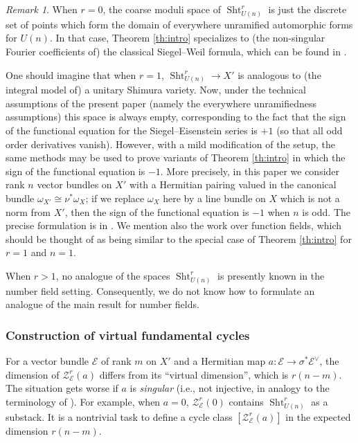 \documentclass[reqno]{amsart}
\numberwithin{equation}{section}
\newcommand{\TFadd}[1]{{\color{blue}#1}}
\newcommand{\Cal}[1]{\mathcal{#1}}
\newcommand{\co}{\colon}
\DeclareMathOperator{\Sht}{Sht}
\newcommand{\s}{\sigma}
\newcommand\cE{\mathcal{E}}
\newcommand\cZ{\mathcal{Z}}
\theoremstyle{remark}
\newtheorem{remark}[thm]{Remark}
\numberwithin{equation}{section}
\begin{document}
\begin{remark}When $r=0$, the coarse moduli space of $\Sht_{U(n)}^r$ is just the discrete set of points which form the domain of everywhere unramified automorphic forms for $U(n)$. In that case, Theorem \ref{th:intro} specializes to (the non-singular Fourier coefficients of) the classical Siegel--Weil formula, which can be found in \cite{Weil1965}. 


One should imagine that when $r=1$, $\Sht_{U(n)}^r \rightarrow X'$ is analogous to (the integral model of) a unitary Shimura variety. Now, under the technical assumptions of the present paper (namely the everywhere unramifiedness assumptions) this space is always empty, corresponding to the fact that the sign of the functional equation for the Siegel--Eisenstein series is $+1$ (so that all odd order derivatives vanish). However, with a mild modification of the setup, the same methods may be used to prove variants of Theorem \ref{th:intro} in which the sign of the functional equation is $-1$. More precisely, in this paper we consider rank $n$ vector bundles on $X'$ with a Hermitian pairing valued in the canonical bundle $\omega_{X'}\cong \nu^* \omega_X$; if we replace $\omega_{X} $ here by a line bundle on $X$ which is not a norm from $X'$, then the sign of the functional equation is $-1$ when $n$ is odd. The precise formulation is in \cite[\S9]{FYZ2}. We mention also the work \cite{Wei19} over function fields, which should be thought of as being similar to the special case of Theorem \ref{th:intro} for $r=1$ and $n=1$.


When $r>1$, no analogue of the spaces $\Sht_{U(n)}^r$ is presently known in the number field setting. Consequently, we do not know how to formulate an analogue of the main result for number fields.

\end{remark}




\subsubsection{Construction of virtual fundamental cycles}
For a vector bundle $\cE$ of rank $m$ on $X'$ and a Hermitian map $a\co \cE\to \s^{*}\cE^{\vee}$,  the dimension of $\Cal{Z}_{\cE}^r(a)$ differs from its ``virtual dimension'', which is $r(n-m)$. The situation gets worse if $a$ is {\em singular} (i.e., not injective, in analogy to the terminology of \cite{KRII}). For example, when $a=0$, $\cZ^{r}_{\cE}(0)$ contains $\Sht^{r}_{U(n)}$ as a substack. It is a nontrivial task to define a cycle class $[\Cal{Z}_{\cE}^r(a)]$ in the expected dimension $r(n-m)$. 
\end{document}
